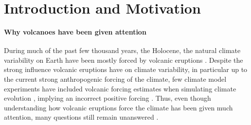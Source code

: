 \documentclass{ametsocV5}
\begin{document}

\section{Introduction and Motivation}

\paragraph*{Why volcanoes have been given attention}

During much of the past few thousand years, the Holocene, the natural climate
variability on Earth have been mostly forced by volcanic eruptions \citep{sigl2022}.
Despite the strong influence volcanic eruptions have on climate variability, in
particular up to the current strong anthropogenic forcing of the climate, few climate
model experiments have included volcanic forcing estimates when simulating climate
evolution \citep{sigl2022}, implying an incorrect positive forcing \citep{gregory2016}.
Thus, even though understanding how volcanic eruptions force the climate has been given
much attention, many questions still remain unanswered
\citep[e.g.,][]{robock2000,zanchettin2019,marshall2022}.

\end{document}
